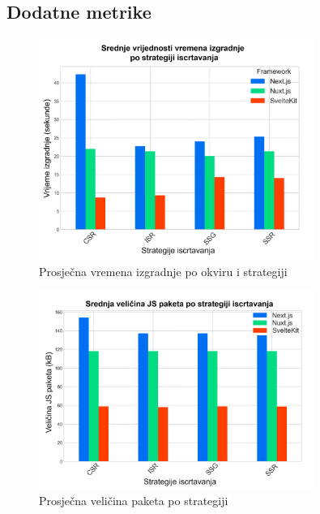 \subsection{Dodatne metrike}

\begin{figure}[H]
    \centering
    \includegraphics[width=0.8\textwidth]{slike/rezultati/dodatne-metrike/average_build_times_by_framework_and_strategy.png}
    \caption{Prosječna vremena izgradnje po okviru i strategiji}
    \label{fig:average_build_times_by_framework_and_strategy}
\end{figure}

\begin{figure}[H]
    \centering
    \includegraphics[width=0.8\textwidth]{slike/rezultati/dodatne-metrike/average_bundle_size_by_strategy.png}
    \caption{Prosječna veličina paketa po strategiji}
    \label{fig:average_bundle_size_by_strategy}
\end{figure}

